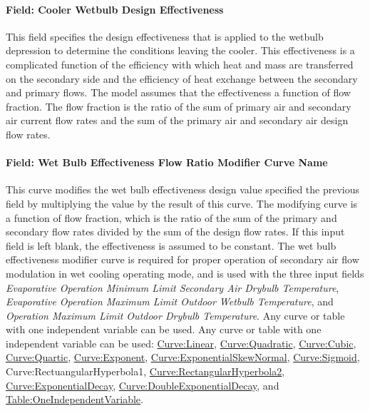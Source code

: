\paragraph{Field: Cooler Wetbulb Design Effectiveness}\label{field-cooler-wetbulb-design-effectiveness}

This field specifies the design effectiveness that is applied to the wetbulb depression to determine the conditions leaving the cooler. This effectiveness is a complicated function of the efficiency with which heat and mass are transferred on the secondary side and the efficiency of heat exchange between the secondary and primary flows. The model assumes that the effectiveness a function of flow fraction. The flow fraction is the ratio of the sum of primary air and secondary air current flow rates and the sum of the primary air and secondary air design flow rates.

\paragraph{Field: Wet Bulb Effectiveness Flow Ratio Modifier Curve Name}\label{field-wet-bulb-effectiveness-flow-ratio-modifier-curve-name}

This curve modifies the wet bulb effectiveness design value specified the previous field by multiplying the value by the result of this curve. The modifying curve is a function of flow fraction, which is the ratio of the sum of the primary and secondary flow rates divided by the sum of the design flow rates. If this input field is left blank, the effectiveness is assumed to be constant. The wet bulb effectiveness modifier curve is required for proper operation of secondary air flow modulation in wet cooling operating mode, and is used with the three input fields \textit{Evaporative Operation Minimum Limit Secondary Air Drybulb Temperature}, \textit{Evaporative Operation Maximum Limit Outdoor Wetbulb Temperature}, and \textit{Operation Maximum Limit Outdoor Drybulb Temperature}. Any curve or table with one independent variable can be used. Any curve or table with one independent variable can be used: \hyperref[curvelinear]{Curve:Linear}, \hyperref[curvequadratic]{Curve:Quadratic}, \hyperref[curvecubic]{Curve:Cubic}, \hyperref[curvequartic]{Curve:Quartic}, \hyperref[curveexponent]{Curve:Exponent}, \hyperref[curveexponentialskewnormal]{Curve:ExponentialSkewNormal}, \hyperref[curvesigmoid]{Curve:Sigmoid}, Curve:RectuangularHyperbola1, \hyperref[curverectangularhyperbola2]{Curve:RectangularHyperbola2}, \hyperref[curveexponentialdecay]{Curve:ExponentialDecay}, \hyperref[curvedoubleexponentialdecay]{Curve:DoubleExponentialDecay}, and \hyperref[tableoneindependentvariable]{Table:OneIndependentVariable}.

